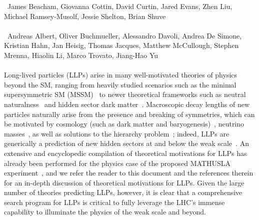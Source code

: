 ~James Beacham, Giovanna Cottin, David Curtin, Jared Evans, Zhen Liu, Michael Ramsey-Musolf, Jessie Shelton, Brian Shuve \\
\text{ \; }\\
~Andreas Albert, Oliver Buchmueller, Alessandro Davoli, Andrea De Simone, Kristian Hahn, Jan Heisig, Thomas Jacques, Matthew McCullough, Stephen Mrenna, Hiaolin Li, Marco Trovato, Jiang-Hao Yu
\text{ \; }\\
\text{ \; }\\


\noindent Long-lived particles (LLPs) arise in many well-motivated theories of physics beyond the SM, ranging from  heavily studied scenarios such as the minimal supersymmetric SM (MSSM)~\cite{Fayet:1976et,Fayet:1977yc,Farrar:1978xj,Fayet:1979sa,Dimopoulos:1981zb} to newer theoretical frameworks such as neutral naturalness~\cite{Chacko:2005pe,Burdman:2006tz,Cai:2008au} and hidden sector dark matter~\cite{Boehm:2002yz,Boehm:2003ha,Pospelov:2007mp,Pospelov:2008zw,ArkaniHamed:2008qn,Pospelov:2008jd}.
Macroscopic decay lengths of new particles naturally arise from the presence and breaking of symmetries, which can be motivated by cosmology (such as dark matter and baryogenesis)~\cite{Bouquet:1986mq,Campbell:1990fa,Cui:2012jh,Barry:2013nva,Cui:2014twa,Ipek:2016bpf,Feng:2008ya,Baumgart:2009tn,Kaplan:2009ag,Chan:2011aa,Dienes:2011ja,Dienes:2012yz,Kim:2013ivd}, neutrino masses~\cite{Helo:2013esa,Antusch:2016vyf,Graesser:2007yj,Graesser:2007pc,Izaguirre:2015pga,Maiezza:2015lza,Batell:2016zod,Cottin:2018kmq,Nemevsek:2018bbt,Curtin:2018ees}, as well as solutions to the hierarchy problem~\cite{Giudice:1998bp,Burdman:2006tz,Cai:2008au,Chacko:2005pe,Fan:2011yu,Barbier:2004ez,Csaki:2013jza,Arvanitaki:2012ps,ArkaniHamed:2012gw}; indeed, LLPs are generically a prediction of new hidden sectors at and below the weak scale~\cite{Chen:1995yu,Thomas:1998wy,Feng:1999fu,Strassler:2006im,Strassler:2006ri,Strassler:2006qa,Han:2007ae,Strassler:2008bv,Strassler:2008fv}. An extensive and encyclopedic compilation of theoretical motivations for LLPs has already been performed for the physics case of the proposed MATHUSLA experiment~\cite{Curtin:2018mvb}, and we refer the reader to this document and the references therein for an in-depth discussion of theoretical motivations for LLPs.
Given the large number of theories predicting LLPs, however, it is clear that a comprehensive search program for LLPs is critical to fully leverage the LHC's immense capability to illuminate the physics of the weak scale and beyond.

